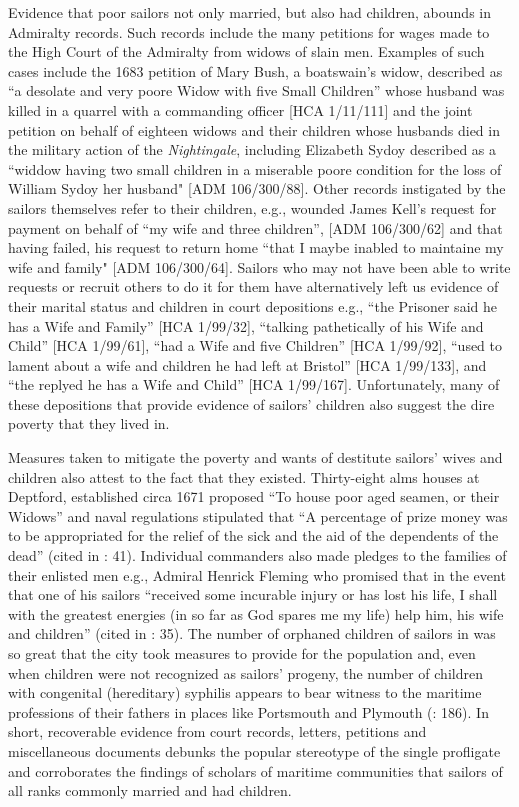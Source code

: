   Evidence that poor sailors not only married, but also had children, abounds in Admiralty records. Such records include the many petitions for wages made to the High Court of the Admiralty from widows of slain men. Examples of such cases include the 1683 petition of Mary Bush, a boatswain’s widow, described as “a desolate and very poore Widow with five Small Children” whose husband was killed in a quarrel with a commanding officer [HCA 1/11/111] and the joint petition on behalf of eighteen widows and their children whose husbands died in the military action of the \textit{Nightingale}, including Elizabeth Sydoy described as a “widdow having two small children in a miserable poore condition for the loss of William Sydoy her husband" [ADM 106/300/88]. Other records instigated by the sailors themselves refer to their children, e.g., wounded  James Kell’s request for payment on behalf of “my wife and three children”, [ADM 106/300/62] and that having failed, his request to return home “that I maybe inabled to maintaine my wife and family" [ADM 106/300/64]. Sailors who may not have been able to write requests or recruit others to do it for them have alternatively left us evidence of their marital status and children in court depositions e.g., “the Prisoner said he has a Wife and Family” [HCA 1/99/32], “talking pathetically of his Wife and Child” [HCA 1/99/61], “had a Wife and five Children” [HCA 1/99/92], “used to lament about a wife and children he had left at Bristol” [HCA 1/99/133], and “the  replyed he has a Wife and Child” [HCA 1/99/167]. Unfortunately, many of these depositions that provide evidence of sailors’ children also suggest the dire poverty that they lived in.

Measures taken to mitigate the poverty and wants of destitute sailors’ wives and children also attest to the fact that they existed. Thirty-eight alms houses at Deptford, established circa 1671 proposed “To house poor aged seamen, or their Widows” and naval regulations stipulated that “A percentage of prize money was to be appropriated for the relief of the sick and the aid of the dependents of the dead” (cited in \citealt{Brown2011}: 41). Individual commanders also made pledges to the families of their enlisted men e.g., Admiral Henrick Fleming who promised that in the event that one of his sailors “received some incurable injury or has lost his life, I shall with the greatest energies (in so far as God spares me my life) help him, his wife and children” (cited in \citealt{Brown2011}: 35). The number of orphaned children of sailors in  was so great that the city took measures to provide for the population \citep[86]{Litter1999} and, even when children were not recognized as sailors’ progeny, the number of children with congenital (hereditary) syphilis appears to bear witness to the maritime professions of their fathers in places like Portsmouth and Plymouth (\citealt{Brown2011}: 186). In short, recoverable evidence from court records, letters, petitions and miscellaneous documents debunks the popular stereotype of the single profligate  and corroborates the findings of scholars of maritime communities that sailors of all ranks commonly married and had children. 

